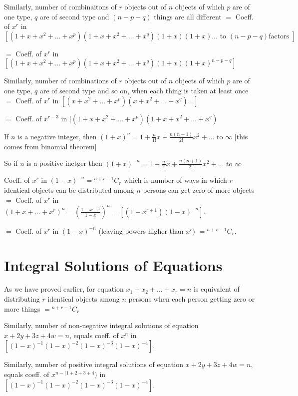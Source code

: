 Similarly, number of combinaitons of $r$ objects out of $n$ objects of which $p$ are of one type, $q$ are of second type and $(n -
p - q)$ things are all different $=$ Coeff. of $x^r$ in $[(1 + x + x^2 + \ldots + x^p)(1 + x + x^2 + \ldots + x^q)(1 + x)(1 +
  x)\ldots \text{~to~} (n - p - q)\text{factors~}]$

$=$ Coeff. of $x^r$ in $[(1 + x + x^2 + \ldots + x^p)(1 + x + x^2 + \ldots + x^q)(1 + x)(1 + x)^{n - p - q}]$

Similarly, number of combinations of $r$ objects out of $n$ objects of which $p$ are of one type, $q$ are of second type and so on,
when each thing is taken at least once $=$ Coeff. of $x^r$ in $[(x + x^2 + \ldots + x^p)(x + x^2 + \ldots + x^q)\ldots]$

$=$ Coeff. of $x^{r - 3}$ in $[(1 + x + x^2 + \ldots + x^p)(1 + x + x^2 + \ldots + x^q)$

If $n$ is a negative integer, then $(1 + x)^n = 1 + \frac{n}{1!}x + \frac{n(n - 1)}{2!}x^2 + \ldots\text{~to~}\infty$ [this comes
  from binomial theorem]

So if $n$ is a positive inetger then $(1 + x)^{-n} = 1 + \frac{n}{1!}x + \frac{n(n + 1)}{2!}x^2 + \ldots\text{~to~}\infty$

Coeff. of $x^r$ in $(1 - x)^{-n} = {}^{n + r - 1}C_r$ which is number of ways in which $r$ identical objects can be distributed
among $n$ persons can get zero of more objects $=$ Coeff. of $x^r$ in $(1 + x + \ldots + x^r)^n = \left(\frac{1 - x^{r + 1}}{1 -
    x}\right)^n = [(1 - x^{r + 1})(1 - x)^{-n}]$.

$=$ Coeff. of $x^r$ in $(1 - x)^{-n}$ (leaving powers higher than $x^r$) $= {}^{n + r - 1}C_r$.

\section{Integral Solutions of Equations}
As we have proved earlier, for equation $x_1 + x_2 + \ldots + x_r = n$ is equivalent of distributing $r$ identical objects among
$n$ persons when each person getting zero or more things $= {}^{n + r - 1}C_r$

Similarly, number of non-negative integral solutions of equation $x + 2y + 3z + 4w = n$, equals coeff. of $x^n$ in $[(1 - x)^{-1}(1
  - x)^{-2}(1 - x)^{-3}(1 - x)^{-4}]$.

Similarly, number of positive integral solutions of equation $x + 2y + 3z + 4w = n$, equals coeff. of $x^{n -(1 + 2 + 3 + 4})$ in
$[(1 - x)^{-1}(1 - x)^{-2}(1 - x)^{-3}(1 - x)^{-4}]$.

